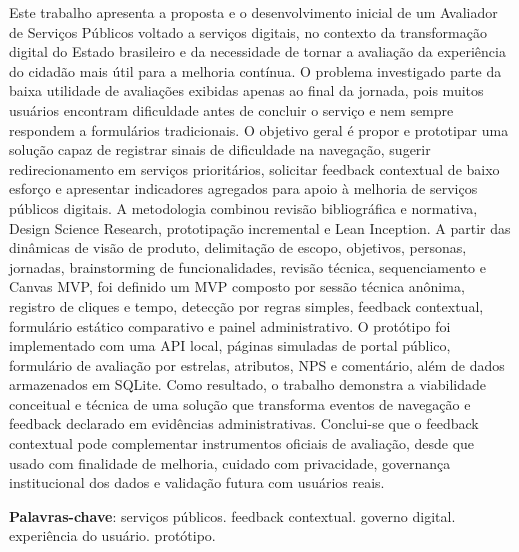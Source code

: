 \begin{resumo}
Este trabalho apresenta a proposta e o desenvolvimento inicial de um Avaliador de
Serviços Públicos voltado a serviços digitais, no contexto da transformação
digital do Estado brasileiro e da necessidade de tornar a avaliação da
experiência do cidadão mais útil para a melhoria contínua. O problema investigado
parte da baixa utilidade de avaliações exibidas apenas ao final da jornada, pois
muitos usuários encontram dificuldade antes de concluir o serviço e nem sempre
respondem a formulários tradicionais. O objetivo geral é propor e prototipar uma
solução capaz de registrar sinais de dificuldade na navegação, sugerir
redirecionamento em serviços prioritários, solicitar feedback contextual de baixo
esforço e apresentar indicadores agregados para apoio à melhoria de serviços
públicos digitais. A metodologia combinou revisão bibliográfica e normativa,
Design Science Research, prototipação incremental e Lean Inception. A partir das
dinâmicas de visão de produto, delimitação de escopo, objetivos, personas,
jornadas, brainstorming de funcionalidades, revisão técnica, sequenciamento e
Canvas MVP, foi definido um MVP composto por sessão técnica anônima, registro de
cliques e tempo, detecção por regras simples, feedback contextual, formulário
estático comparativo e painel administrativo. O protótipo foi implementado com
uma API local, páginas simuladas de portal público, formulário de avaliação por
estrelas, atributos, NPS e comentário, além de dados armazenados em SQLite. Como
resultado, o trabalho demonstra a viabilidade conceitual e técnica de uma solução
que transforma eventos de navegação e feedback declarado em evidências
administrativas. Conclui-se que o feedback contextual pode complementar
instrumentos oficiais de avaliação, desde que usado com finalidade de melhoria,
cuidado com privacidade, governança institucional dos dados e validação futura
com usuários reais.

\vspace{\onelineskip}

\noindent
\textbf{Palavras-chave}: serviços públicos. feedback contextual. governo
digital. experiência do usuário. protótipo.
\end{resumo}
